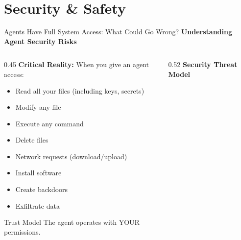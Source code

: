 \documentclass[aspectratio=169,11pt]{beamer}
\begin{document}
\section{Security \& Safety}

\begin{frame}{Agents Have Full System Access: What Could Go Wrong?}
    \textbf{Understanding Agent Security Risks}

    \begin{columns}[T]
        \begin{column}{0.45\textwidth}
            \textbf{Critical Reality:}
            When you give an agent access:
            \begin{itemize}
                \item Read all your files (including keys, secrets)
                \item Modify any file
                \item Execute any command
                \item Delete files
                \item Network requests (download/upload)
                \item Install software
                \item Create backdoors
                \item Exfiltrate data
            \end{itemize}

            \begin{alertblock}{Trust Model}
                The agent operates with YOUR permissions.
            \end{alertblock}
        \end{column}
        \begin{column}{0.52\textwidth}
            \centering
            \textbf{Security Threat Model}

\end{column}
\end{columns}
\end{frame}
\end{document}
